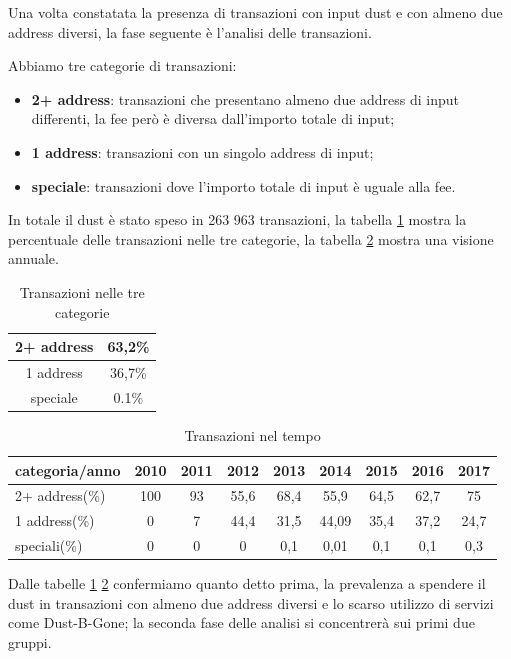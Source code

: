 Una volta constatata la presenza di transazioni con input dust e con almeno due address diversi, la fase seguente è l'analisi delle transazioni. 

Abbiamo tre categorie di transazioni: 
\begin{itemize}
    \item \textbf{2+ address}: transazioni che presentano almeno due address di input differenti, la fee però è diversa dall'importo totale di input;
    \item \textbf{1 address}: transazioni con un singolo address di input;
    \item \textbf{speciale}: transazioni dove l'importo totale di input è uguale alla fee.
\end{itemize}

In totale il dust è stato speso in 263 963 transazioni, la tabella \ref{tab:tx_categories} mostra la percentuale delle transazioni nelle tre categorie, la tabella \ref{tab:tx_categories_year} mostra una visione annuale.
\begin{table}[H]
    \centering
    \begin{tabular}{|c|c|}
        \hline
        2+ address & 63,2\%\\
        \hline
        1 address & 36,7\%\\
        \hline
        speciale & 0.1\%\\
        \hline
    \end{tabular}
    \caption{Transazioni nelle tre categorie}
    \label{tab:tx_categories}
\end{table}
\begin{table}[H]
    \centering
    \begin{tabular}{|l|c|c|c|c|c|c|c|c|}
        \hline
            categoria/anno  & 2010 & 2011 & 2012 & 2013 & 2014 & 2015 & 2016 & 2017\\
        \hline 
         2+ address(\%) & 100 & 93 & 55,6 & 68,4 & 55,9 & 64,5 & 62,7 & 75 \\
         \hline
         1 address(\%) & 0 & 7 & 44,4 & 31,5 & 44,09 & 35,4 & 37,2 & 24,7  \\
         \hline
         speciali(\%) & 0 & 0 & 0 & 0,1 & 0,01 & 0,1 & 0,1 & 0,3 \\
         \hline
    \end{tabular}
    \caption{Transazioni nel tempo}
    \label{tab:tx_categories_year}
\end{table}
Dalle tabelle \ref{tab:tx_categories} \ref{tab:tx_categories_year} confermiamo quanto detto prima, la prevalenza a spendere il dust in transazioni con almeno due address diversi e lo scarso utilizzo di servizi come Dust-B-Gone; la seconda fase delle analisi si concentrerà sui primi due gruppi.\\
